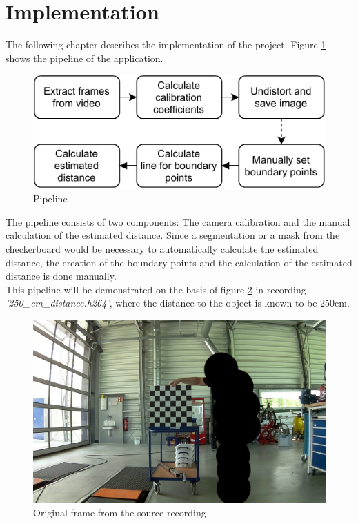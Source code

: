 \section{Implementation}\label{implement}

The following chapter describes the implementation of the project. Figure \ref{fig:pipeline} shows the pipeline of the application.

\begin{figure}[H]
    \centering
    \includegraphics[width=.7\textwidth]{image/2/pipeline.pdf}
    \caption{Pipeline}
    \label{fig:pipeline}
\end{figure}
The pipeline consists of two components: The camera calibration and the manual calculation of the estimated distance. Since a segmentation or a mask from the checkerboard would be necessary to automatically calculate the estimated distance, the creation of the boundary points and the calculation of the estimated distance is done manually.\\

This pipeline will be demonstrated on the basis of figure \ref{fig:250_ref_og} in recording \textit{'250\_cm\_distance.h264'}, where the distance to the object is known to be 250cm.

\begin{figure}[H]
    \centering
    \includegraphics[width=.7\textwidth]{image/2/250_ref_og.png}
    \caption{Original frame from the source recording}
    \label{fig:250_ref_og}
\end{figure}

\newpage
\vspace{-2em}
